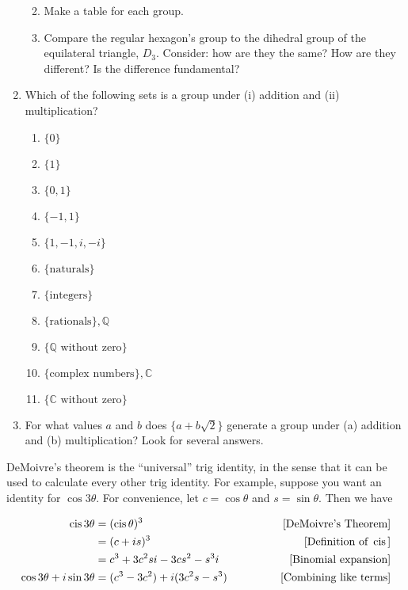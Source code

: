\documentclass[../gatm.tex]{subfiles}
\begin{document}
\begin{enumerate}
\begin{enumerate}
\begin{multicols}{2}
\end{multicols}
\item Make a table for each group.
\item Compare the regular hexagon's group to the dihedral group of the equilateral triangle, $D_3$. Consider: how are they the same? How are they different? Is the difference fundamental?
\end{enumerate}
\item Which of the following sets is a group under (i) addition and (ii) multiplication?
\begin{multicols}{3}
\begin{enumerate}
\item $\{0\}$
\item $\{1\}$
\item $\{0,1\}$
\item $\{-1,1\}$
\item $\{1, -1, i, -i\}$
\item $\{\text{naturals}\}$
\item $\{\text{integers}\}$
\item $\{\text{rationals}\}, \mathbb{Q}$
\item $\{\mathbb{Q}\text{ without zero}\}$
\item $\{\text{complex numbers}\}, \mathbb{C}$
\item $\{\mathbb{C}\text{ without zero}\}$
\end{enumerate}
\end{multicols}
\item For what values $a$ and $b$ does $\{a + b\sqrt{2}\}$ generate a group under (a) addition and (b) multiplication? Look for several answers.

\setcounter{cg_problem_i}{\value{enumi}}
\end{enumerate}

\noindent DeMoivre's theorem is the ``universal'' trig identity, in the sense that it can be used to calculate every other trig identity. For example, suppose you want an identity for $\cos 3\theta$. For convenience, let $c=\cos\theta$ and $s=\sin\theta$. Then we have

\begin{align*}
\operatorname{cis} 3\theta &= (\operatorname{cis} \theta)^3  & \qquad \text{[DeMoivre's Theorem]} \\
&= (c+is)^3 & \qquad \text{[Definition of } \operatorname{cis} \text{]} \\
&= c^3 + 3c^2s i - 3cs^2 - s^3 i & \qquad \text{[Binomial expansion]} \\
\cos 3\theta + i\sin 3\theta &= (c^3 - 3c^2) + i (3c^2 s - s^3) \qquad & \text{[Combining like terms]}\\
\end{align*}
\end{document}
